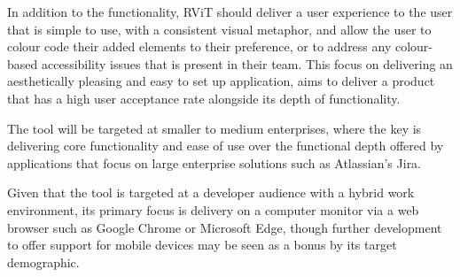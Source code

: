 \documentclass[l4proj.tex]{subfiles}
\begin{document}
In addition to the functionality, RViT should deliver a user experience to the user that is simple to use, with a consistent visual metaphor, and allow the user to colour code their added elements to their preference, or to address any colour-based accessibility issues that is present in their team. This focus on delivering an aesthetically pleasing and easy to set up application, aims to deliver a product that has a high user acceptance rate alongside its depth of functionality.

The tool will be targeted at smaller to medium enterprises, where the key is delivering core functionality and ease of use over the functional depth offered by applications that focus on large enterprise solutions such as Atlassian’s Jira.

Given that the tool is targeted at a developer audience with a hybrid work environment, its primary focus is delivery on a computer monitor via a web browser such as Google Chrome or Microsoft Edge, though further development to offer support for mobile devices may be seen as a bonus by its target demographic.
\end{document}
